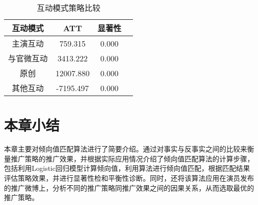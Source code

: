 \begin{table}[h]
\centering
\caption{互动模式策略比较}
\label{r3}
\begin{tabular}{|c|c|c|c|} \hline
互动模式& ATT & 显著性\\ \hline
主演互动  & 759.315& 0.000\\ \hline
与官微互动 & 3413.222& 0.000\\ \hline
原创  & 12007.880& 0.000\\ \hline
其他互动 & -7195.497 & 0.000\\ 
\hline\end{tabular}
\end{table}


\section{本章小结}

本章主要对倾向值匹配算法进行了简要介绍。通过对事实与反事实之间的比较来衡量推广策略的推广效果，并根据实际应用情况介绍了倾向值匹配算法的计算步骤，包括利用Logistic回归模型计算倾向值，利用算法进行倾向值匹配，根据匹配结果评估策略效果，并进行显著性检和平衡性诊断。同时，还将该算法应用在演员发布的推广微博上，分析不同的推广策略同推广效果之间的因果关系，从而选取最优的推广策略。






















